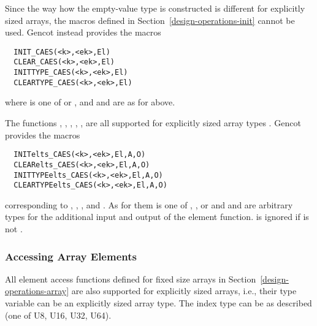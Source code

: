 Since the way how the empty-value type is constructed is different for explicitly sized arrays, the macros defined in
Section~\ref{design-operations-init} cannot be used. Gencot instead provides the macros
\begin{verbatim}
  INIT_CAES(<k>,<ek>,El)
  CLEAR_CAES(<k>,<ek>,El)
  INITTYPE_CAES(<k>,<ek>,El)
  CLEARTYPE_CAES(<k>,<ek>,El)
\end{verbatim}
where  is one of  or , and  and  are as for  above.

The functions , , , , , 
 are all supported for explicitly sized array types . Gencot provides the macros
\begin{verbatim}
  INITelts_CAES(<k>,<ek>,El,A,O)
  CLEARelts_CAES(<k>,<ek>,El,A,O)
  INITTYPEelts_CAES(<k>,<ek>,El,A,O)
  CLEARTYPEelts_CAES(<k>,<ek>,El,A,O)
\end{verbatim}
corresponding to , , , and . As for them
 is one of , , or  and  and  are arbitrary types for the 
additional input and output of the element function.  is ignored if  is not .

\subsubsection{Accessing Array Elements}

All element access functions defined for fixed size arrays in Section~\ref{design-operations-array} are also supported for 
explicitly sized arrays, i.e., their type variable  can be an explicitly sized array type. The index type 
can be as described (one of U8, U16, U32, U64).
